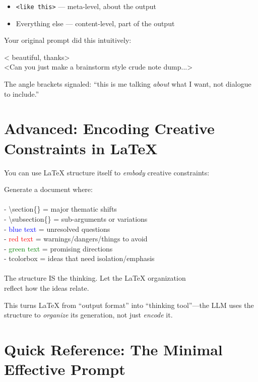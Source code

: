 \documentclass[11pt,letterpaper]{article}
\begin{document}
\begin{itemize}
    \item \texttt{<like this>} --- meta-level, about the output
    \item Everything else --- content-level, part of the output
\end{itemize}

Your original prompt did this intuitively:

\begin{tcolorbox}[promptbox]
< beautiful, thanks>\\
<Can you just make a brainstorm style crude note dump...>
\end{tcolorbox}

The angle brackets signaled: ``this is me talking \textit{about} what I want, not dialogue to include.''

\section{Advanced: Encoding Creative Constraints in LaTeX}

You can use LaTeX structure itself to \textit{embody} creative constraints:

\begin{tcolorbox}[promptbox]
Generate a document where:\\
\\
- \textbackslash section\{\} = major thematic shifts\\
- \textbackslash subsection\{\} = sub-arguments or variations\\
- \textcolor{blue}{blue text} = unresolved questions\\
- \textcolor{red}{red text} = warnings/dangers/things to avoid\\
- \textcolor{green}{green text} = promising directions\\
- tcolorbox = ideas that need isolation/emphasis\\
\\
The structure IS the thinking. Let the LaTeX organization \\
reflect how the ideas relate.
\end{tcolorbox}

This turns LaTeX from ``output format'' into ``thinking tool''---the LLM uses the structure to \textit{organize} its generation, not just \textit{encode} it.

\section{Quick Reference: The Minimal Effective Prompt}
\end{document}
